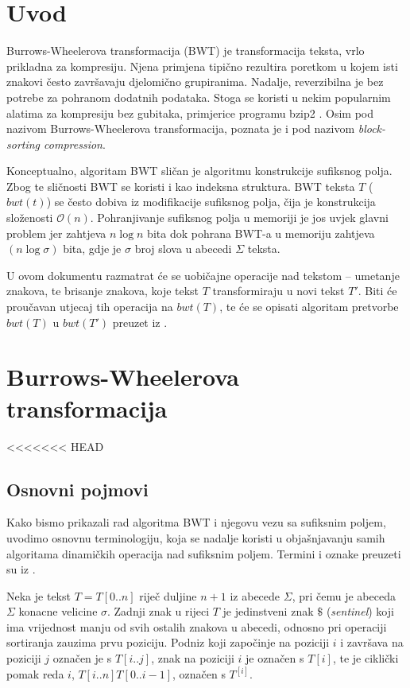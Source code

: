 \documentclass{ferseminar}
\newcommand{\engterm}[1]{\emph{#1}}
\newcommand{\complexity}[1]{$\mathcal{O}(#1)$}
\begin{document}
\stvoripredstranice
\section{Uvod}

Burrows-Wheelerova transformacija (BWT) \citep{burrows1994block} je transformacija teksta, vrlo prikladna za kompresiju. Njena primjena tipično rezultira poretkom u kojem isti znakovi često završavaju djelomično grupiranima. Nadalje, reverzibilna je bez potrebe za pohranom dodatnih podataka. Stoga se koristi u nekim popularnim alatima za kompresiju bez gubitaka, primjerice programu bzip2 \citep{bzip2}. Osim pod nazivom Burrows-Wheelerova transformacija, poznata je i pod nazivom \engterm{block-sorting compression}. 

Konceptualno, algoritam BWT sli\v{c}an je algoritmu konstrukcije sufiksnog polja. Zbog te sličnosti BWT se koristi i kao indeksna struktura. BWT teksta $T$ ($bwt(t)$) se često dobiva iz modifikacije sufiksnog polja, \v{c}ija je konstrukcija slo\v{z}enosti \complexity{n}. Pohranjivanje sufiksnog polja u memoriji je jos uvjek glavni problem jer zahtjeva $n\log{}n$ bita dok pohrana BWT-a u memoriju zahtjeva $(n\log{}\sigma)$ bita, gdje je $\sigma$ broj slova u abecedi $\Sigma$ teksta.

U ovom dokumentu razmatrat će se uobičajne operacije nad tekstom -- umetanje znakova, te brisanje znakova, koje tekst $T$ transformiraju u novi tekst $T'$. Biti će proučavan utjecaj tih operacija na $bwt(T)$, te \'{c}e se opisati algoritam pretvorbe $bwt(T)$ u $bwt(T')$ preuzet iz \citep{salson2009four}.

\section{Burrows-Wheelerova transformacija}
<<<<<<< HEAD

\subsection{Osnovni pojmovi}
Kako bismo prikazali rad algoritma BWT i njegovu vezu sa sufiksnim poljem, uvodimo osnovnu terminologiju, koja se nadalje koristi u obja\v{s}njavanju samih algoritama dinami\v{c}kih operacija nad sufiksnim poljem. Termini i oznake preuzeti su iz \citep{salson2009four}.

Neka je tekst $T=T[0..n]$ riječ duljine $n+1$ iz abecede $\Sigma$, pri čemu je abeceda $\Sigma$ konacne velicine $\sigma$. Zadnji znak u rijeci $T$ je jedinstveni znak $\$$ (\engterm{sentinel}) koji ima vrijednost manju od svih ostalih znakova u abecedi, odnosno pri operaciji sortiranja zauzima prvu poziciju. Podniz koji zapo\v{c}inje na poziciji $i$ i zavr\v{s}ava na poziciji $j$ ozna\v{c}en je s $T[i..j]$, znak na poziciji $i$ je ozna\v{c}en s $T[i]$, te je ciklički pomak reda $i$,  $T[i..n]T[0..i-1]$, ozna\v{c}en s $T^{[i]}$.
\end{document}
